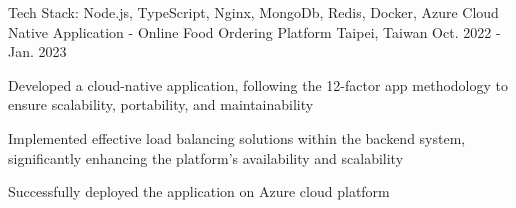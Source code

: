 

\begin{cventries}


  \cventry
    {\color{awesome}Tech Stack: Node.js, TypeScript, Nginx, MongoDb, Redis, Docker, Azure} %
    {Cloud Native Application - Online Food Ordering Platform} %
    {Taipei, Taiwan} %
    {Oct. 2022 - Jan. 2023} %
    {
      \begin{cvitems} %
        \item {Developed a cloud-native application, following the 12-factor app methodology to ensure scalability, portability, and maintainability}
        \item {Implemented effective load balancing solutions within the backend system, significantly enhancing the platform's availability and scalability}
        \item {Successfully deployed the application on Azure cloud platform}
      \end{cvitems}
    }



\end{cventries}
